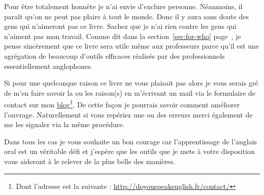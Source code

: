 Pour être totalement honnête je n'ai envie d'exclure
personne. Néanmoins, il paraît qu'on ne peut pas plaire à tout le
monde. Donc il y aura sans doute des gens qui n'aimeront pas ce
livre. Sachez que je n'ai rien contre les gens qui n'aiment pas mon
travail. Comme dit dans la section~\ref{sec:for-who}
page~\pageref{sec:for-who}, je pense sincèrement que ce livre sera
utile même aux professeurs parce qu'il est une agrégation de beaucoup
d'outils efficaces réalisés par des professionnels essentiellement
anglophones.

Si pour une quelconque raison ce livre ne vous plaisait pas alors je
vous serais gré de m'en faire savoir la ou les raison(s) en m'écrivant un mail
via le formulaire de contact sur mon \href{http://doyouspeakenglish.fr/contact/}{blog}\footnote{Dont l'adresse est
  la suivante : \url{http://doyouspeakenglish.fr/contact/}}. De cette
façon je pourrais savoir comment améliorer l'ouvrage. Naturellement si
vous repériez une ou des erreurs merci également de me les signaler
via la même procédure.

Dans tous les cas je vous souhaite un bon courage car l'apprentissage
de l'anglais oral est un véritable défi et j'espère que les outils que
je mets à votre disposition vous aideront à le relever de la plus
belle des manières.

\begin{center}
\end{center}

\newpage
\minitoc

